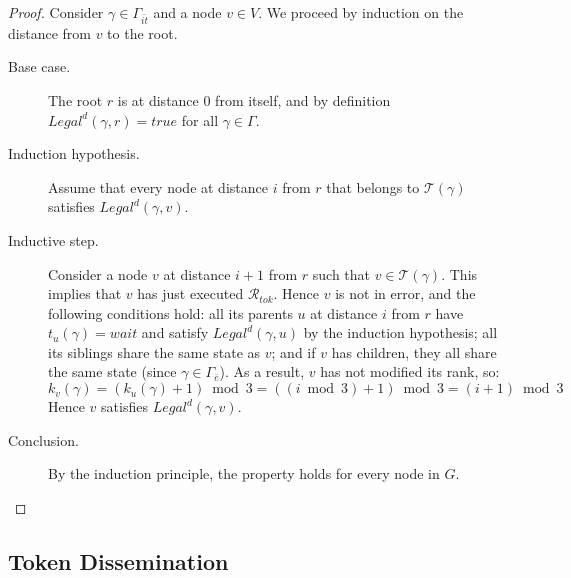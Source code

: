 \documentclass[a4paper, 12pt]{article}
\newcommand{\rk}{k}
\newcommand{\Rtok}{$\mathscr{R}_{tok}$}
\begin{document}
\begin{proof}
Consider $\gamma \in \Gamma_{\bar{it}}$ and a node $v \in V$. We proceed by 
induction on the distance from $v$ to the root.

\begin{description}

\item[Base case.] The root $r$ is at distance $0$ from itself, and by 
definition $Legal^d(\gamma, r) = \mathit{true}$ for all 
$\gamma \in \Gamma$.

\item[Induction hypothesis.] Assume that every node at distance $i$ 
from $r$ that belongs to $\mathcal{T}(\gamma)$ satisfies 
$Legal^d(\gamma, v)$.

\item[Inductive step.] Consider a node $v$ at distance $i+1$ from $r$ 
such that $v \in \mathcal{T}(\gamma)$. This implies that $v$ has just 
executed \Rtok. Hence $v$ is not in error, and the following conditions 
hold: all its parents $u$ at distance $i$ from $r$ have 
$t_u(\gamma) = \mathit{wait}$ and satisfy $Legal^d(\gamma, u)$ by the 
induction hypothesis; all its siblings share the same state as $v$; 
and if $v$ has children, they all share the same state 
(since $\gamma \in \Gamma_{\bar{e}}$). As a result, $v$ has not 
modified its rank, so:
$$\rk_v(\gamma) = (\rk_u(\gamma) + 1) \bmod 3 = 
((i \bmod 3) + 1) \bmod 3 = (i+1) \bmod 3$$
Hence $v$ satisfies $Legal^d(\gamma, v)$.

\item[Conclusion.] By the induction principle, the property holds for 
every node in $G$.

\end{description}
\end{proof}
\subsection{Token Dissemination}
\label{sec:tokDis}
\end{document}
